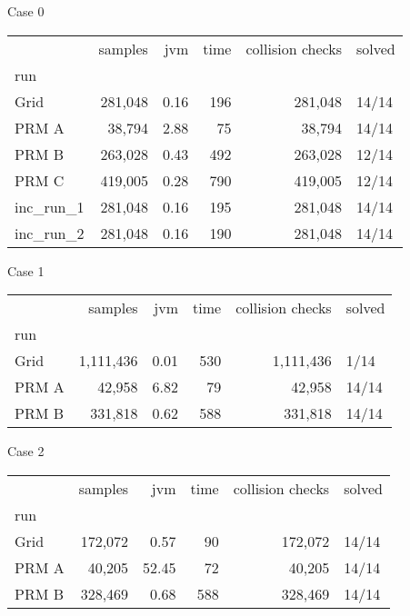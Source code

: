 Case 0
\begin{tabular}{lrrrrl}
\toprule
{} & samples &  jvm & time & collision checks & solved \\
run       &         &      &      &                  &        \\
\midrule
Grid      & 281,048 & 0.16 &  196 &          281,048 &  14/14 \\
PRM A     &  38,794 & 2.88 &   75 &           38,794 &  14/14 \\
PRM B     & 263,028 & 0.43 &  492 &          263,028 &  12/14 \\
PRM C     & 419,005 & 0.28 &  790 &          419,005 &  12/14 \\
inc\_run\_1 & 281,048 & 0.16 &  195 &          281,048 &  14/14 \\
inc\_run\_2 & 281,048 & 0.16 &  190 &          281,048 &  14/14 \\
\bottomrule
\end{tabular}


Case 1
\begin{tabular}{lrrrrl}
\toprule
{} &   samples &  jvm & time & collision checks & solved \\
run   &           &      &      &                  &        \\
\midrule
Grid  & 1,111,436 & 0.01 &  530 &        1,111,436 &   1/14 \\
PRM A &    42,958 & 6.82 &   79 &           42,958 &  14/14 \\
PRM B &   331,818 & 0.62 &  588 &          331,818 &  14/14 \\
\bottomrule
\end{tabular}


Case 2
\begin{tabular}{lrrrrl}
\toprule
{} & samples &   jvm & time & collision checks & solved \\
run   &         &       &      &                  &        \\
\midrule
Grid  & 172,072 &  0.57 &   90 &          172,072 &  14/14 \\
PRM A &  40,205 & 52.45 &   72 &           40,205 &  14/14 \\
PRM B & 328,469 &  0.68 &  588 &          328,469 &  14/14 \\
\bottomrule
\end{tabular}


